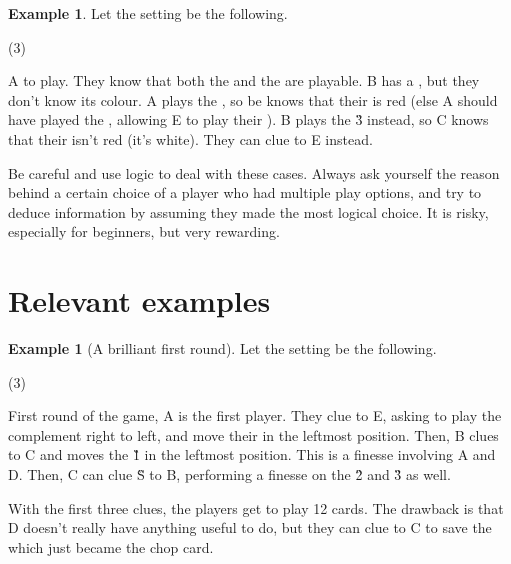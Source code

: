 \documentclass[a4paper]{article}
\theoremstyle{plain}
\theoremstyle{definition}
\newtheorem{example}[theorem]{Example}
\begin{document}
\begin{example}
	
	Let the setting be the following.
	
	\begin{tasks}(3)
		\task[+]      
		\task[A]    
		\task[B]    
		\task[C]    
		\task[D]    
		\task[E]    
	\end{tasks}
	
	A to play. They know that both the  and the  are playable. B has a , but they don't know its colour. A plays the , so be knows that their  is red (else A should have played the , allowing E to play their ). B plays the \G{3} instead, so C knows that their  isn't red (it's white). They can clue  to E instead.
\end{example}

Be careful and use logic to deal with these cases. Always ask yourself the reason behind a certain choice of a player who had multiple play options, and try to deduce information by assuming they made the most logical choice. It is risky, especially for beginners, but very rewarding.

\section{Relevant examples}

\begin{example}[A brilliant first round]
	
	Let the setting be the following.
	
	\begin{tasks}(3)
		\task[+]      
		\task[A]    
		\task[B]    
		\task[C]    
		\task[D]    
		\task[E]    
	\end{tasks}
	
	First round of the game, A is the first player. They clue  to E, asking to play the complement right to left, and move their  in the leftmost position. Then, B clues  to C and moves the \G{1} in the leftmost position. This is a finesse involving A and D. Then, C can clue \G{S} to B, performing a finesse on the \G{2} and \G{3} as well.
	
	With the first three clues, the players get to play 12 cards. The drawback is that D doesn't really have anything useful to do, but they can clue  to C to save the  which just became the chop card.	
\end{example}
\end{document}
